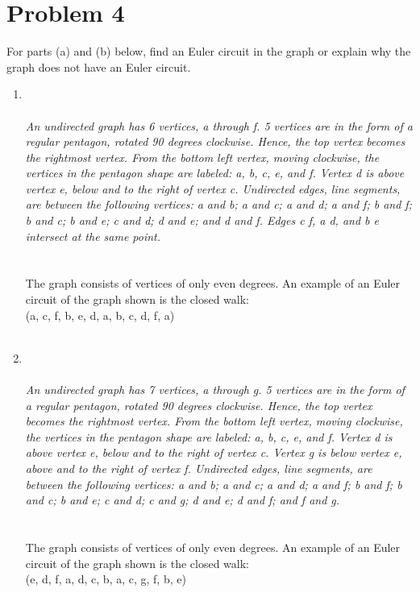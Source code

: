 \documentclass{amsart}
\theoremstyle{definition}
\theoremstyle{Exercise}
\theoremstyle{remark}
\theoremstyle{rule}
\numberwithin{equation}{section}
\begin{document}
 \newpage
 
\vspace*{0.25in}
\section*{Problem 4}
For parts (a) and (b) below, find an Euler circuit in the graph or explain why the graph does not have an Euler circuit.\\
\begin{enumerate}[label=(\alph*)]
\item
{}\\\\
{\color{blue}{\bf Figure 9:} \emph{An undirected graph has 6 vertices, a through f. 5 vertices are in the form of a regular pentagon, rotated 90 degrees clockwise. Hence, the top vertex becomes the rightmost vertex. From the bottom left vertex, moving clockwise, the vertices in the pentagon shape are labeled: a, b, c, e, and f. Vertex d is above vertex e, below and to the right of vertex c. Undirected edges, line segments, are between the following vertices: a and b; a and c; a and d; a and f; b and f; b and c; b and e; c and d; d and e; and d and f. Edges c f, a d, and b e intersect at the same point.
\\
}
}
\\
\\
The graph consists of vertices of only even degrees. An example of an Euler circuit of the graph shown is the closed walk:\\
(a, c, f, b, e, d, a, b, c, d, f, a)
\\\\

\newpage
\vspace*{0.2in}
\item
{}\\\\
{\color{blue}{\bf Figure 10:} \emph{An undirected graph has 7 vertices, a through g. 5 vertices are in the form of a regular pentagon, rotated 90 degrees clockwise. Hence, the top vertex becomes the rightmost vertex. From the bottom left vertex, moving clockwise, the vertices in the pentagon shape are labeled: a, b, c, e, and f. Vertex d is above vertex e, below and to the right of vertex c. Vertex g is below vertex e, above and to the right of vertex f. Undirected edges, line segments, are between the following vertices: a and b; a and c; a and d; a and f; b and f; b and c; b and e; c and d; c and g; d and e; d and f; and f and g.
\\
}
}
\\
\\
The graph consists of vertices of only even degrees. An example of an Euler circuit of the graph shown is the closed walk:\\
(e, d, f, a, d, c, b, a, c, g, f, b, e)
\\\\


\end{enumerate}
\end{document}
